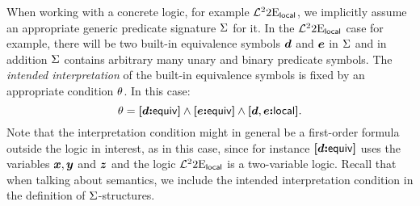 When working with a concrete logic, for example
$\mathcal{L}^{2}_{{}}{2}\mathrm{E}_{\mathsf{local}}$,
we implicitly assume an appropriate generic predicate signature $\mathrm{\Sigma}$ for it.
In the $\mathcal{L}^{2}_{{}}{2}\mathrm{E}_{\mathsf{local}}$ case for example, there will be two
built-in equivalence symbols $\bm{d}$ and $\bm{e}$ in $\mathrm{\Sigma}$ and in addition $\mathrm{\Sigma}$
contains arbitrary many unary and binary predicate symbols.
The \emph{intended interpretation} of the built-in equivalence symbols is fixed
by an appropriate condition $\theta$.
In this case:
\[
  \theta = {\bm{[}\bm{d}\mathord{\bm{:}}\mathsf{equiv}\bm{]}} \land {\bm{[}\bm{e}\mathord{\bm{:}}\mathsf{equiv}\bm{]}} \land {\bm{[}\bm{d},\bm{e}\mathord{\bm{:}}\mathsf{local}\bm{]}}.
\] 
Note that the interpretation condition might in general be a first-order formula
outside the logic in interest, as in this case, since for instance ${\bm{[}\bm{d}\mathord{\bm{:}}\mathsf{equiv}\bm{]}}$
uses the variables $\bm{x},\bm{y}$ and $\bm{z}$ and the logic
$\mathcal{L}^{2}_{{}}{2}\mathrm{E}_{\mathsf{local}}$ is a two-variable logic.
Recall that when talking about semantics, we include the intended interpretation
condition in the definition of $\mathrm{\Sigma}$-structures.